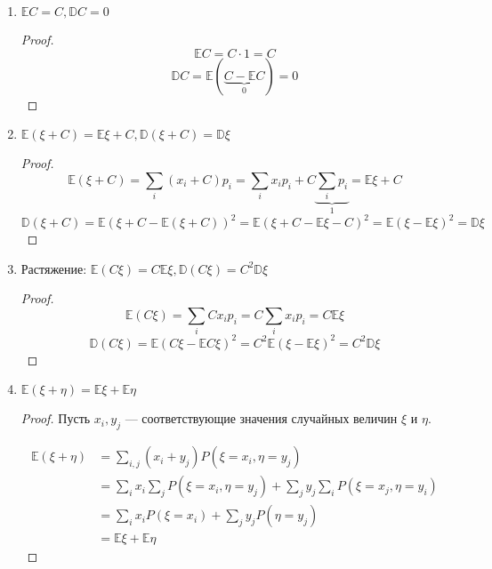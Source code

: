 \begin{prop}\itemfix
    \begin{enumerate}
        \item \(\mathbb{E}C = C, \mathbb{D}C = 0\)
              \begin{proof}
                  \[\mathbb{E}C = C \cdot 1 = C\]
                  \[\mathbb{D}C = \mathbb{E}(\underbrace{C - \mathbb{E}C}_0) = 0\]
              \end{proof}

        \item \(\mathbb{E}(\xi + C) = \mathbb{E}\xi + C, \mathbb{D}(\xi + C) = \mathbb{D}\xi\)
              \begin{proof}
                  \[\mathbb{E}(\xi + C) = \sum_i (x_i + C)p_i = \sum_i x_i p_i + C \underbrace{\sum_i p_i}_1 = \mathbb{E}\xi + C\]
                  \[\mathbb{D}(\xi + C) =  \mathbb{E}(\xi + C - \mathbb{E}(\xi + C))^2 = \mathbb{E}(\xi + C - \mathbb{E}\xi - C)^2 = \mathbb{E}(\xi - \mathbb{E}\xi)^2 = \mathbb{D}\xi\]
              \end{proof}

        \item Растяжение: \(\mathbb{E}(C\xi) = C \mathbb{E}\xi, \mathbb{D}(C\xi) = C^2 \mathbb{D}\xi\)
              \begin{proof}
                  \[\mathbb{E}(C\xi) = \sum_i C x_i p_i = C \sum_i x_i p_i = C \mathbb{E}\xi\]
                  \[\mathbb{D}(C\xi) = \mathbb{E}(C\xi - \mathbb{E}C\xi)^2 = C^2 \mathbb{E}(\xi - \mathbb{E}\xi)^2 = C^2 \mathbb{D}\xi\]
              \end{proof}

        \item \(\mathbb{E}(\xi + \eta) = \mathbb{E}\xi + \mathbb{E}\eta\)
              \begin{proof}
                  Пусть \(x_i, y_j\) --- соответствующие значения случайных величин \(\xi\) и \(\eta\).

                  \begin{align*}
                      \mathbb{E}(\xi + \eta) & = \sum_{i, j} (x_i + y_j)P(\xi = x_i, \eta = y_j)                                         \\
                                             & = \sum_i x_i \sum_j P(\xi = x_i, \eta = y_j) + \sum_j y_j \sum_i P(\xi = x_j, \eta = y_i) \\
                                             & = \sum_i x_i P(\xi = x_i) + \sum_j y_j P(\eta = y_j)                                      \\
                                             & = \mathbb{E} \xi + \mathbb{E} \eta
                  \end{align*}


\end{proof}
\end{enumerate}
\end{prop}

